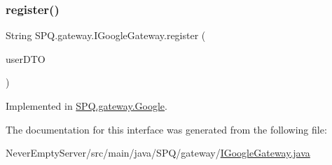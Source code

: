 \subsubsection{\texorpdfstring{register()}{register()}}
{\footnotesize\ttfamily String S\+P\+Q.\+gateway.\+I\+Google\+Gateway.\+register (\begin{DoxyParamCaption}\item[{\mbox{\hyperlink{class_s_p_q_1_1dto_1_1_user_d_t_o}{User\+D\+TO}}}]{user\+D\+TO }\end{DoxyParamCaption})}



Implemented in \mbox{\hyperlink{class_s_p_q_1_1gateway_1_1_google_ab287ce4fd789224c45be6037a99a937b}{S\+P\+Q.\+gateway.\+Google}}.



The documentation for this interface was generated from the following file\+:\begin{DoxyCompactItemize}
\item 
Never\+Empty\+Server/src/main/java/\+S\+P\+Q/gateway/\mbox{\hyperlink{_i_google_gateway_8java}{I\+Google\+Gateway.\+java}}\end{DoxyCompactItemize}

